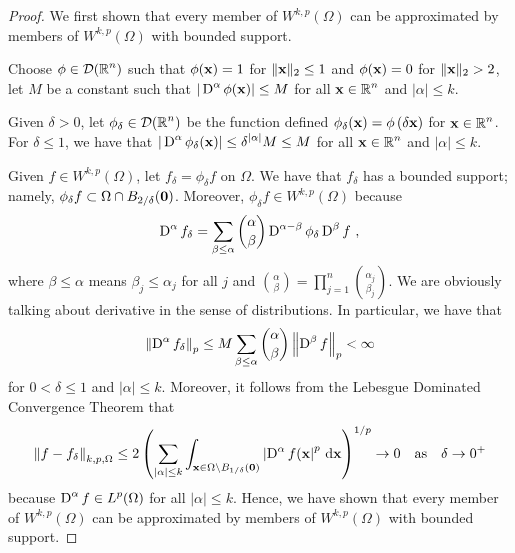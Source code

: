 \begin{proof}
 We first shown that every member of
$\displaystyle W^{k,p}(\Omega)$ can be approximated by members of
$\displaystyle W^{k,p}(\Omega)$ with bounded support.

Choose $\displaystyle \phi\in \mathcal{D}(\mathbb{R}^n)$ such that
$\phi(\mathbf{x}) = 1$ for $\|\mathbf{x}\|_2 \leq 1$ and
$\phi(\mathbf{x}) = 0$ for $\|\mathbf{x}\|_2 > 2$, let $M$ be a constant such
that $\displaystyle |\operatorname{D}^{\alpha}\phi(\mathbf{x})| \leq M$ for all
$\displaystyle \mathbf{x} \in \mathbb{R}^n$ and
$|\alpha| \leq k$.

Given $\delta >0$, let $\displaystyle \phi_\delta \in \mathcal{D}(\mathbb{R}^n)$ be
the function defined
$\displaystyle \phi_\delta(\mathbf{x}) = \phi\left(\delta \mathbf{x}\right)$
for $\displaystyle \mathbf{x} \in \mathbb{R}^n$.  For $\delta \leq 1$, we have that
$\displaystyle |\operatorname{D}^{\alpha} \phi_\delta(\mathbf{x})| \leq
\delta^{|\alpha|} M \leq M$ for all
$\displaystyle \mathbf{x} \in \mathbb{R}^n$ and $|\alpha| \leq k$.

Given $\displaystyle f \in W^{k,p}(\Omega)$, let
$f_\delta = \phi_\delta f$ on $\Omega$.  We have that $f_\delta$ has a bounded
support; namely,
$\displaystyle \phi_\delta f \subset \Omega \cap B_{2/\delta}(\mathbf{0})$.
Moreover, $\displaystyle \phi_\delta f \in W^{k,p}(\Omega)$ because
\[
\operatorname{D}^{\alpha} f_\delta = \sum_{\beta\leq \alpha} \binom{\alpha}{\beta}
\operatorname{D}^{\alpha-\beta} \phi_{\delta} \operatorname{D}^{\beta} f \ ,
\]
where $\beta \leq \alpha$ means $\beta_j \leq \alpha_j$ for all $j$
and $\displaystyle \binom{\alpha}{\beta} = 
\prod_{j=1}^n \binom{\alpha_j}{\beta_j}$.  We are obviously talking
about derivative in the sense of distributions.
In particular, we have that
\[
\left\| \operatorname{D}^{\alpha} f_\delta \right\|_p
\leq M \sum_{\beta\leq \alpha} \binom{\alpha}{\beta}
\left\| \operatorname{D}^{\beta} f \right\|_p < \infty
\]
for $0 < \delta \leq 1$ and $|\alpha| \leq k$.  Moreover, it follows
from the Lebesgue Dominated Convergence Theorem that
\[
\left\| f - f_\delta \right\|_{k,p,\Omega}
\leq 2 \left(
\sum_{|\alpha|\leq k} \int_{\mathbf{x} \in \Omega \setminus B_{1/\delta}(\mathbf{0})}
\left| \operatorname{D}^\alpha f(\mathbf{x} \right|^p \,\mathrm{d}{\mathbf{x}} \right)^{1/p} \to 0 
\quad \text{as} \quad \delta \to 0^+
\]
because $\displaystyle \operatorname{D}^{\alpha}f \in L^p(\Omega)$ for all
$|\alpha| \leq k$.  Hence, we have shown that every member of
$\displaystyle W^{k,p}(\Omega)$ can be approximated by members of
$\displaystyle W^{k,p}(\Omega)$ with bounded support.


\end{proof}
